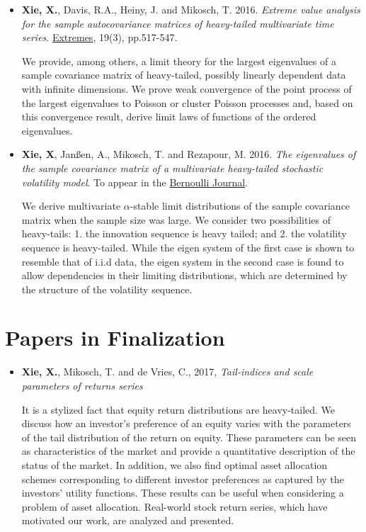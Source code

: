 \documentclass[a4paper]{twentysecondcv} %
\begin{document}
\begin{itemize}
\item {\bf Xie, X.}, Davis, R.A., Heiny, J. and Mikosch, T.
  2016. {\it Extreme value analysis for the sample autocovariance
    matrices of heavy-tailed multivariate time series}.
  \underline{Extremes}, 19(3), pp.517-547.
  
  {\small
  We provide, among others, a limit theory for the largest eigenvalues
  of a sample covariance matrix of heavy-tailed, possibly linearly
  dependent data with infinite dimensions. We prove weak convergence of
  the point process of the largest eigenvalues to Poisson or cluster
  Poisson processes and, based on this convergence result, derive limit
  laws of functions of the ordered eigenvalues.}

\item {\bf Xie, X}, Jan\ss en, A., Mikosch, T. and Rezapour, M.
  2016. {\it The eigenvalues of the sample covariance matrix of a
    multivariate heavy-tailed stochastic volatility model}.
  To appear in the \underline{Bernoulli Journal}.
  
  {\small
  We derive multivariate $\alpha$-stable limit distributions of the
  sample covariance matrix when the sample size was large. We
  consider two possibilities of heavy-tails: 1. the innovation
  sequence is heavy tailed; and 2. the volatility sequence is
  heavy-tailed. While the eigen system of the first case is shown to
  resemble that of i.i.d data, the eigen system in the second case is
  found to allow dependencies in their limiting distributions, which
  are determined by the structure of the volatility sequence.}
\end{itemize}

\section{Papers in Finalization}
\begin{itemize}
\item {\bf Xie, X.}, Mikosch, T. and de Vries, C., 2017,
  {\it Tail-indices and scale parameters of returns series}

  {\small
    It is a stylized fact that equity return distributions are
    heavy-tailed. We discuss how an investor's preference of an equity
    varies with the parameters of the tail distribution of the return on
    equity. These parameters can be seen as characteristics of the
    market and provide a quantitative description of the status of the
    market.
    In addition, we also find optimal asset allocation schemes
    corresponding to different investor preferences as captured by the
    investors' utility functions. These results can be useful when
    considering a problem of asset allocation. Real-world stock return
    series, which have motivated our work, are analyzed and presented.
  }
\end{itemize}
\end{document}
